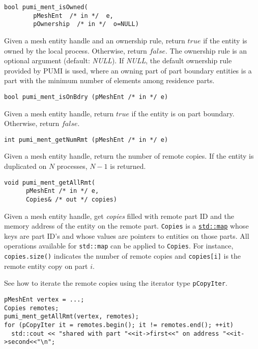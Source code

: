 \begin{verbatim}
bool pumi_ment_isOwned(
        pMeshEnt  /* in */  e, 
        pOwnership  /* in */  o=NULL)
\end{verbatim}\vspace{-.5cm}\hspace{1cm}       
        Given a mesh entity handle and an ownership rule, return $true$ if the entity is owned by the local process.  Otherwise, return $false$. The ownership rule is an optional argument (default: \emph{NULL}). If \emph{NULL}, the default ownership rule provided by PUMI is used, where an owning part of part boundary entities is a part with the minimum number of elements among residence parts.

\begin{verbatim}
bool pumi_ment_isOnBdry (pMeshEnt /* in */ e)
\end{verbatim}\vspace{-.5cm}\hspace{1cm}
        Given a mesh entity handle, return $true$ if the entity is on part boundary. Otherwise, return $false$.

\begin{verbatim}
int pumi_ment_getNumRmt (pMeshEnt /* in */ e)
\end{verbatim}\vspace{-.5cm}\hspace{1cm}
	Given a mesh entity handle, return the number of remote copies. If the entity is duplicated on $N$ processes, $N-1$ is returned.

\begin{verbatim}
void pumi_ment_getAllRmt(
      pMeshEnt /* in */ e, 
      Copies& /* out */ copies)
\end{verbatim}\vspace{-.5cm}\hspace{1cm}	
	Given a mesh entity handle, get \emph{copies} filled with remote part ID and the memory address of the entity on the remote part. \texttt{Copies} is a \href{http://www.cplusplus.com/reference/map/map/}{\texttt{std::map}}
whose keys are part ID's and whose values are pointers to entities on those parts. All operations available for \texttt{std::map} can be applied to \texttt{Copies}. For instance, \texttt{copies.size()} indicates the number of remote copies and \texttt{copies[i]} is the remote entity copy on part $i$. 

See how to iterate the remote copies using the iterator type \texttt{pCopyIter}.
\begin{verbatim}
pMeshEnt vertex = ...;
Copies remotes;
pumi_ment_getAllRmt(vertex, remotes);
for (pCopyIter it = remotes.begin(); it != remotes.end(); ++it)
  std::cout << "shared with part "<<it->first<<" on address "<<it->second<<"\n";
\end{verbatim}\vspace{-.5cm}\hspace{1cm}

